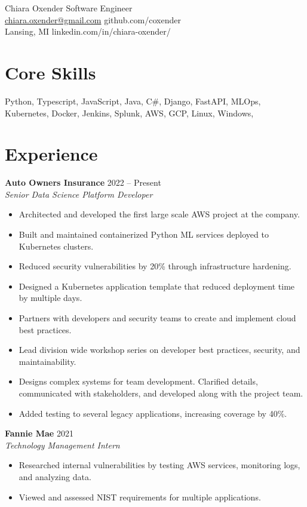 \documentclass[11pt]{article}
\begin{document}
{\LARGE Chiara Oxender} \hfill Software Engineer\\
\href{mailto:chiara.oxender@gmail.com}{chiara.oxender@gmail.com} \hfill github.com/coxender\\
Lansing, MI \hfill linkedin.com/in/chiara-oxender/


\section*{Core Skills}
Python, Typescript, JavaScript, Java, C\#, Django, FastAPI, MLOps, Kubernetes, Docker, Jenkins, Splunk, AWS, GCP, Linux, Windows, 

\section*{Experience}
\textbf{Auto Owners Insurance} \hfill 2022 -- Present\\
\textit{Senior Data Science Platform Developer}
\begin{itemize}
  \item Architected and developed the first large scale AWS project at the company.
  \item Built and maintained containerized Python ML services deployed to Kubernetes clusters.
  \item Reduced security vulnerabilities by 20\% through infrastructure hardening.
 \item Designed a Kubernetes application template that reduced deployment time by multiple days.
 \item Partners with developers and security teams to  create and implement cloud best practices.
 \item Lead division wide workshop series on developer best practices, security, and maintainability.
 \item Designs complex systems for team development. Clarified details, communicated with stakeholders, and developed along with the project team. 
 \item Added testing to several legacy applications, increasing coverage by 40\%.
\end{itemize}

\textbf{Fannie Mae} \hfill 2021 \\
\textit{Technology Management Intern}
\begin{itemize}
  \item Researched internal vulnerabilities by testing AWS services, monitoring logs, and analyzing data.
  \item Viewed and assessed NIST requirements for multiple applications.
\end{itemize}
\end{document}
